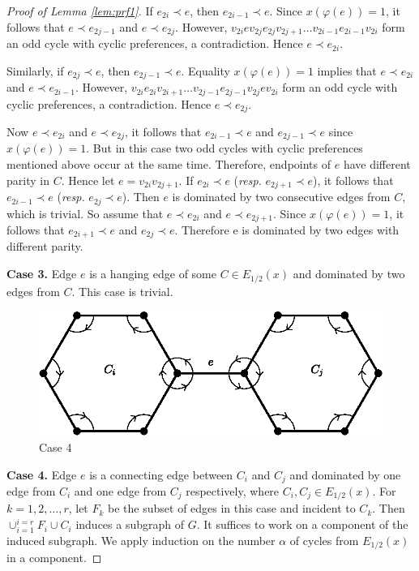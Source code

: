 \documentclass[11pt]{article}
\numberwithin{theorem}{section}
\begin{document}
\begin{proof}[Proof of Lemma \ref{lem:prf1}]
If $e_{2i}\prec e$, then $e_{2i-1}\prec e$. Since $x(\varphi(e))=1$, it follows that $e\prec e_{2j-1}$ and $e\prec e_{2j}$. However, $v_{2i} e v_{2j} e_{2j} v_{2j+1} \ldots v_{2i-1} e_{2i-1} v_{2i}$ form an odd cycle with cyclic preferences, a contradiction. Hence $e\prec e_{2i}$.

Similarly, if $e_{2j}\prec e$, then $e_{2j-1}\prec e$. Equality $x(\varphi(e))=1$ implies that $e\prec e_{2i}$ and $e\prec e_{2i-1}$. However, $v_{2i} e_{2i} v_{2i+1} \ldots v_{2j-1} e_{2j-1} v_{2j} e v_{2i}$ form an odd cycle with cyclic preferences, a contradiction. Hence $e\prec e_{2j}$.

Now $e\prec e_{2i}$ and $e\prec e_{2j}$, it follows that $e_{2i-1}\prec e$ and $e_{2j-1}\prec e$ since $x(\varphi(e))=1$. But in this case two odd cycles with cyclic preferences mentioned above occur at the same time.
Therefore, endpoints of $e$ have different parity in $C$. Hence let $e=v_{2i} v_{2j+1}$.
If $e_{2i}\prec e$ (\textit{resp.} $e_{2j+1}\prec e$), it follows that $e_{2i-1}\prec e$ (\textit{resp.} $e_{2j}\prec e$). Then $e$ is dominated by two consecutive edges from $C$, which is trivial.  So assume that $e\prec e_{2i}$ and $e\prec e_{2j+1}$. Since $x(\varphi(e))=1$, it follows that $e_{2i+1}\prec e$ and $e_{2j}\prec e$. Therefore e is dominated by two edges with different parity.

\textbf{Case 3.} Edge $e$ is a hanging edge of some $C\in E_{1/2}(x)$ and dominated by two edges from $C$. This case is trivial.

\begin{figure}
\centering
\includegraphics[scale=0.85]{KernelMengerian-fig2}
\caption{Case 4}
\end{figure}
\textbf{Case 4.} Edge $e$ is a connecting edge between $C_i$ and $C_j$ and dominated by one edge from $C_i$ and one edge from $C_j$ respectively, where $C_i, C_j \in E_{1/2}(x)$.
For $k=1,2,\ldots,r$, let $F_k$ be the subset of edges in this case and incident to $C_k$.
Then $\cup_{i=1}^{i=r} F_i\cup C_i$ induces a subgraph of $G$. It suffices to work on a component of the induced subgraph. We apply induction on the number $\alpha$ of cycles from $E_{1/2}(x)$ in a component.


\end{proof}
\end{document}
